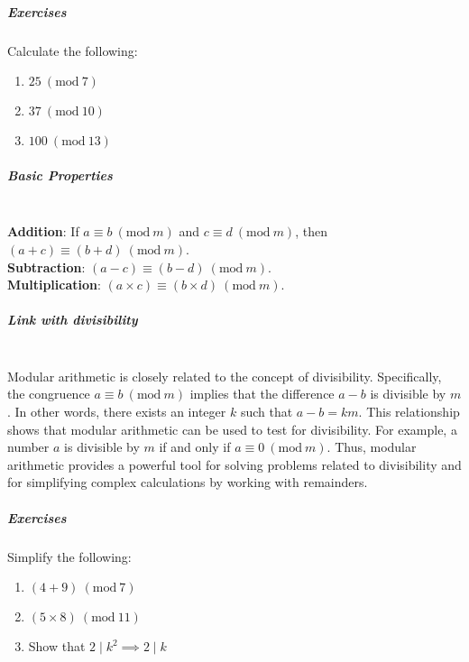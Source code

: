 \documentclass[]{article}
\begin{document}
	\subparagraph{Exercises}
	Calculate the following:
	\begin{enumerate}
		\item $25 \ (\text{mod} \ 7)$
		\item $37 \ (\text{mod} \ 10)$
		\item $100 \ (\text{mod} \ 13)$
	\end{enumerate}
	
	\subparagraph{Basic Properties}
	\noindent \\
	\textbf{Addition}: If $a \equiv b \ (\text{mod} \ m)$ and $c \equiv d \ (\text{mod} \ m)$, then $(a + c) \equiv (b + d) \ (\text{mod} \ m)$.
	\noindent \\
	\textbf{Subtraction}: $(a - c) \equiv (b - d) \ (\text{mod} \ m)$.
	\noindent \\
	\textbf{Multiplication}: $(a \times c) \equiv (b \times d) \ (\text{mod} \ m)$.
	
	\subparagraph{Link with divisibility}
	\noindent \\
	Modular arithmetic is closely related to the concept of divisibility.
	Specifically, the congruence $a \equiv b \ (\text{mod} \ m)$ implies that the difference $a - b$ is divisible by $m$.
	In other words, there exists an integer $k$ such that $a - b = km$.
	This relationship shows that modular arithmetic can be used to test for divisibility.
	For example, a number $a$ is divisible by $m$ if and only if $a \equiv 0 \ (\text{mod} \ m)$.
	Thus, modular arithmetic provides a powerful tool for solving problems related to divisibility and for simplifying complex calculations by working with remainders.
	
	\subparagraph{Exercises}
	Simplify the following:
	\begin{enumerate}
		\item $(4 + 9) \ (\text{mod} \ 7)$
		\item $(5 \times 8) \ (\text{mod} \ 11)$
		\item Show that $2 \mid k^2 \implies 2 \mid k$
	\end{enumerate}

	
\end{document}

